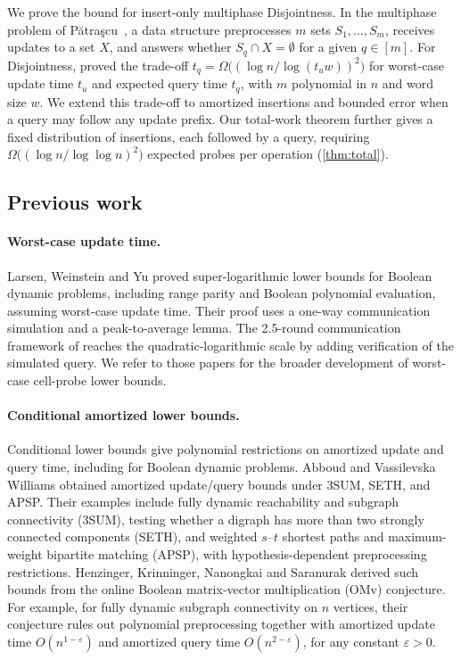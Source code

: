 \documentclass[11pt]{article}
\theoremstyle{plain}
\newcommand{\eps}{\varepsilon}
\newcommand{\Patrascu}{P\u{a}tra\c{s}cu}
\begin{document}
We prove the bound for insert-only multiphase Disjointness. In the multiphase problem of \Patrascu~\cite{patrascu_mihai_towards_2010}, a data structure preprocesses $m$ sets $S_1,\dots,S_m$, receives updates to a set $X$, and answers whether $S_q\cap X=\emptyset$ for a given $q\in[m]$. For Disjointness, \cite{ko_omegalog_2026} proved the trade-off $t_q=\Omega\big((\log n/\log(t_uw))^2\big)$ for worst-case update time $t_u$ and expected query time $t_q$, with $m$ polynomial in $n$ and word size $w$. We extend this trade-off to amortized insertions and bounded error when a query may follow any update prefix. Our total-work theorem further gives a fixed distribution of insertions, each followed by a query, requiring $\Omega\big((\log n/\log\log n)^2\big)$ expected probes per operation (\cref{thm:total}).

\subsection{Previous work}\label{sec:previous}

\paragraph{Worst-case update time.}
Larsen, Weinstein and Yu \cite{larsen_crossing_2020} proved super-logarithmic lower bounds for Boolean dynamic problems, including range parity and Boolean polynomial evaluation, assuming worst-case update time. Their proof uses a one-way communication simulation and a peak-to-average lemma. The 2.5-round communication framework of \cite{ko_omega_2026,ko_omegalog_2026} reaches the quadratic-logarithmic scale by adding verification of the simulated query. We refer to those papers for the broader development of worst-case cell-probe lower bounds.

\paragraph{Conditional amortized lower bounds.}
Conditional lower bounds give polynomial restrictions on amortized update and query time, including for Boolean dynamic problems. Abboud and Vassilevska Williams \cite{abboud_popular_2014} obtained amortized update/query bounds under 3SUM, SETH, and APSP. Their examples include fully dynamic reachability and subgraph connectivity (3SUM), testing whether a digraph has more than two strongly connected components (SETH), and weighted $s$--$t$ shortest paths and maximum-weight bipartite matching (APSP), with hypothesis-dependent preprocessing restrictions. Henzinger, Krinninger, Nanongkai and Saranurak \cite{henzinger_unifying_2015} derived such bounds from the online Boolean matrix-vector multiplication (OMv) conjecture. For example, for fully dynamic subgraph connectivity on $n$ vertices, their conjecture rules out polynomial preprocessing together with amortized update time $O(n^{1-\eps})$ and amortized query time $O(n^{2-\eps})$, for any constant $\eps>0$.
\end{document}
